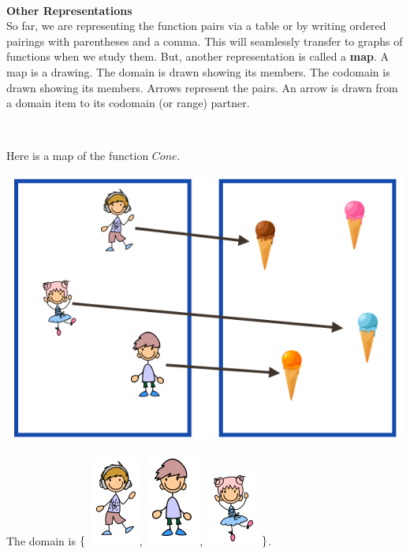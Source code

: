 \documentclass{ximera}
\begin{document}
\quad \\

\textbf{Other Representations} \\
So far, we are representing the function pairs via a table or by writing ordered pairings with parentheses and a comma.  This will seamlessly transfer to graphs of functions when we study them.  But, another representation is called a \textbf{map}.  A map is a drawing.  The domain is drawn showing its members. The codomain is drawn showing its members. Arrows represent the pairs.  An arrow is drawn from a domain item to its codomain (or range) partner.

\quad \\


\begin{example}
Here is a map of the function $Cone$.

\begin{image}
\includegraphics{pics/f_20.png}
\end{image}


The domain is $\Large{ \{ }$ \includegraphics{pics/d1.png}, \includegraphics{pics/d3.png}, \includegraphics{pics/d2.png} $\Large{ \} }$.
\quad \\


\end{example}
\end{document}
